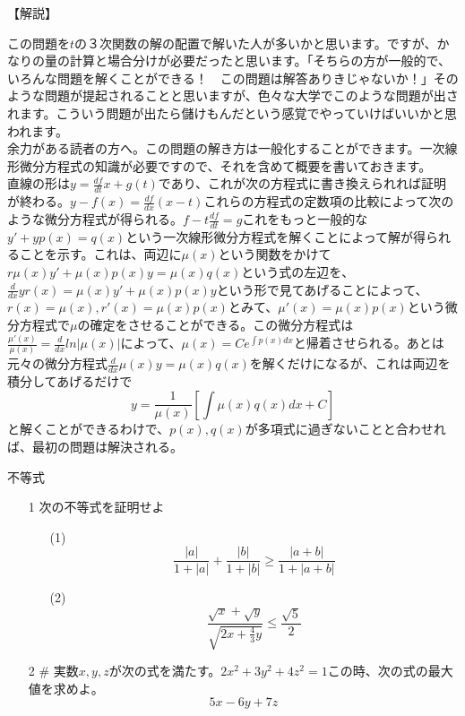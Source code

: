 \documentclass[a4paper,fleqn,dvipdfmx]{jsarticle}
\begin{document}
\begin{flushleft}
【解説】
\end{flushleft}
この問題を$t$の３次関数の解の配置で解いた人が多いかと思います。ですが、かなりの量の計算と場合分けが必要だったと思います。「そちらの方が一般的で、いろんな問題を解くことができる！　この問題は解答ありきじゃないか！」そのような問題が提起されることと思いますが、色々な大学でこのような問題が出されます。こういう問題が出たら儲けもんだという感覚でやっていけばいいかと思われます。\\
余力がある読者の方へ。この問題の解き方は一般化することができます。一次線形微分方程式の知識が必要ですので、それを含めて概要を書いておきます。\\
直線の形は$y=\frac{df}{dt}x+g(t)$であり、これが次の方程式に書き換えられれば証明が終わる。$y-f(x)=\frac{df}{dx}(x-t)$これらの方程式の定数項の比較によって次のような微分方程式が得られる。$f-t\frac{df}{dt}=g$これをもっと一般的な$y'+yp(x)=q(x)$という一次線形微分方程式を解くことによって解が得られることを示す。これは、両辺に$\mu(x)$という関数をかけて$r\mu(x)y'+\mu(x)p(x)y=\mu(x)q(x)$という式の左辺を、$\frac{d}{dx}yr(x)=\mu(x)y'+\mu(x)p(x)y$という形で見てあげることによって、$r(x)=\mu(x),r'(x)=\mu(x)p(x)$とみて、$\mu'(x)=\mu(x)p(x)$という微分方程式で$\mu$の確定をさせることができる。この微分方程式は$\frac{\mu'(x)}{\mu(x)}=\frac{d}{dx}ln|\mu(x)|$によって、$\mu(x)=Ce^{\int p(x)dx}$と帰着させられる。あとは元々の微分方程式$\frac{d}{dx}\mu(x)y=\mu(x)q(x)$を解くだけになるが、これは両辺を積分してあげるだけで
$$y=\displaystyle\frac{1}{\mu(x)}\left[ \int \mu(x) q(x) dx + C\right]$$
と解くことができるわけで、$p(x),q(x)$が多項式に過ぎないことと合わせれば、最初の問題は解決される。



\newpage

\begin{itembox}[l]{不等式}
    \begin{itemize}
        \item [1] 次の不等式を証明せよ
            \begin{itemize}
                \item [(1)] $$\frac{|a|}{1+|a|}+\frac{|b|}{1+|b|} \geq \frac{|a+b|}{1+|a+b|}$$
                \item [(2)] $$\frac{\sqrt{x}+\sqrt{y}}{\sqrt{2x+\frac{4}{3}y}}\leq \frac{\sqrt{5}}{2}$$
            \end{itemize}
        \item [2] \# 実数$x,y,z$が次の式を満たす。$2x^2+3y^2+4z^2=1$この時、次の式の最大値を求めよ。$$5x-6y+7z$$
    \end{itemize}
\end{itembox}
\end{document}
